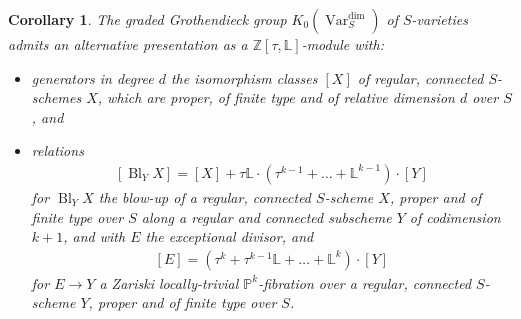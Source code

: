 \documentclass[10pt,a4paper]{amsart}
\newtheorem{cor}{Corollary}
\DeclareMathOperator{\Bl}{Bl}
\newcommand{\KdimS}{K_0(\Var_S^{\dim})}
\DeclareMathOperator{\Var}{Var}
\begin{document}
\begin{cor}\label{bit module}
The graded Grothendieck group $\KdimS$ of $S$-varieties admits an alternative presentation as a $\mathbb{Z}[\tau, \mathbb{L}]$-module with:

\begin{itemize}
    \item generators in degree $d$ the isomorphism classes $[X]$ of regular, connected $S$-schemes $X$, which are proper, of finite type and of relative dimension $d$ over $S$, and
    \item relations
        \begin{align}\tag{1}
            [\Bl_Y X] = [X] + \tau \mathbb{L} \cdot (\tau^{k-1} + \ldots + \mathbb{L}^{k-1}) \cdot [Y]
        \end{align}
        for $\Bl_Y X$ the blow-up of a regular, connected $S$-scheme $X$, proper and of finite type over $S$ along a regular and connected subscheme $Y$ of codimension $k+1$, and with $E$ the exceptional divisor, and 
        \begin{align}\tag{2}
            [E] = (\tau^{k}+ \tau^{k-1} \mathbb{L} +  \ldots + \mathbb{L}^{k}) \cdot [Y]
        \end{align} 
        for $E \rightarrow Y$ a Zariski locally-trivial $\mathbb{P}^k$-fibration over a regular, connected $S$-scheme $Y$, proper and of finite type over $S$.
        
\end{itemize}
\end{cor}
\end{document}

